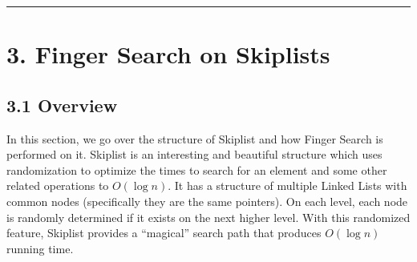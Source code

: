 \documentclass[12pt,english,]{article}
\let\origfigure\figure
\let\endorigfigure\endfigure
\renewenvironment{figure}[1][2] {
    \expandafter\origfigure\expandafter[H]
} {
    \endorigfigure
}
\begin{document}
\begin{figure}
\begin{minipage}{0.95\textwidth}
\begin{center}
\end{center}
\end{minipage}
\caption[Caption]{The graph of ratios $r_d$ versus different values of $d$ given in figure \ref{fig:TreapResult}.}
\label{fig:TreapGraph}
\end{figure}
\hrule

\hypertarget{section3}{%
\section{\texorpdfstring{3. \enspace Finger Search on
Skiplists}{3. Finger Search on Skiplists}}\label{section3}}

\hypertarget{overview-1}{%
\subsection{3.1 Overview}\label{overview-1}}

In this section, we go over the structure of Skiplist and how Finger
Search is performed on it. Skiplist is an interesting and beautiful
structure which uses randomization to optimize the times to search for
an element and some other related operations to \(O(\log n)\). It has a
structure of multiple Linked Lists with common nodes (specifically they
are the same pointers). On each level, each node is randomly determined
if it exists on the next higher level. With this randomized feature,
Skiplist provides a ``magical'' search path that produces \(O(\log n)\)
running time.
\end{document}
